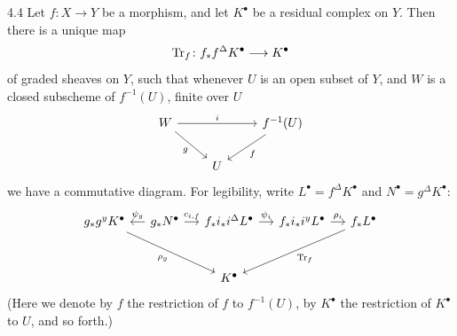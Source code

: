 \begin{booklemma}{4.4}\label{lem:6.4.4}
Let $f\colon X\to Y$ be a morphism, and let $K^\bullet$ be a residual complex on $Y$. Then there is a unique map
\[
\operatorname{Tr}_f\colon f_*f^{\Delta}K^{\bullet} \longrightarrow K^{\bullet}
\]
of graded sheaves on $Y$, such that whenever $U$ is an open subset of $Y$, and $W$ is a closed subscheme of $f^{-1}(U)$, finite over $U$
\[
\begin{tikzcd}
W \ar[rr,"i"] \ar[dr,"g"'] && f^{-1}(U) \ar[dl,"f"] \\
& U
\end{tikzcd}
\]
 we have a commutative diagram. For legibility, write $L^\bullet=f^\Delta K^\bullet$ and $N^\bullet=g^\Delta K^\bullet$:
\[
\begin{tikzcd}[column sep=1.2em,row sep=3em]
g_*g^y K^\bullet \ar[drr,"\rho_g"'] &
g_*N^\bullet \ar[l,"\psi_g"'] \ar[r,"c_{i,f}"] &
f_*i_*i^\Delta L^\bullet \ar[r,"\psi_i"] &
f_*i_*i^y L^\bullet \ar[r,"\rho_i"] &
f_*L^\bullet \ar[dll,"\Tr_f"] \\
&& K^\bullet &&
\end{tikzcd}
\]
(Here we denote by $f$ the restriction of $f$ to $f^{-1}(U)$, by $K^\bullet$ the restriction of $K^\bullet$ to $U$, and so forth.)
\end{booklemma}\par\endgroup


